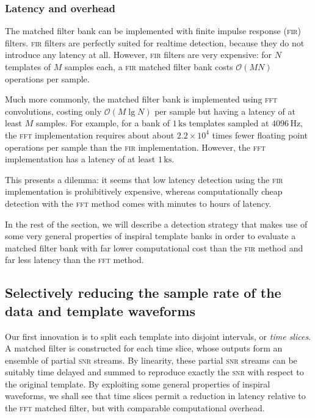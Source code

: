 \subsubsection{Latency and overhead}

The matched filter bank can be implemented with finite impulse response (\textsc{fir}) filters.  \textsc{fir} filters are perfectly suited for realtime detection, because they do not introduce any latency at all.  However, \textsc{fir} filters are very expensive: for $N$ templates of $M$ samples each, a \textsc{fir} matched filter bank costs $\mathcal O(M N)$ operations per sample.

Much more commonly, the matched filter bank is implemented using \textsc{fft} convolutions, costing only $\mathcal O(M \lg N)$  per sample but having a latency of at least $M$ samples.  For example, for a bank of $1\,\mathrm{ks}$ templates sampled at $4096\,\mathrm{Hz}$, the \textsc{fft} implementation requires about about $2.2 \times 10^4$ times fewer floating point operations per sample than the \textsc{fir} implementation.  However, the \textsc{fft} implementation has a latency of at least $1\,\mathrm{ks}$.

This presents a dilemma: it seems that low latency detection using the \textsc{fir} implementation is prohibitively expensive, whereas computationally cheap detection with the \textsc{fft} method comes with minutes to hours of latency.

In the rest of the section, we will describe a detection strategy that makes use of some very general properties of inspiral template banks in order to evaluate a matched filter bank with far lower computational cost than the \textsc{fir} method and far less latency than the \textsc{fft} method.

\subsection{Selectively reducing the sample rate of the data and template waveforms}

Our first innovation is to split each template into disjoint intervals, or \emph{time slices}.  A matched filter is constructed for each time slice, whose outputs form an ensemble of partial \textsc{snr} streams.  By linearity, these partial \textsc{snr} streams can be suitably time delayed and summed to reproduce exactly the \textsc{snr} with respect to the original template.  By exploiting some general properties of inspiral waveforms, we shall see that time slices permit a reduction in latency relative to the \textsc{fft} matched filter, but with comparable computational overhead.

